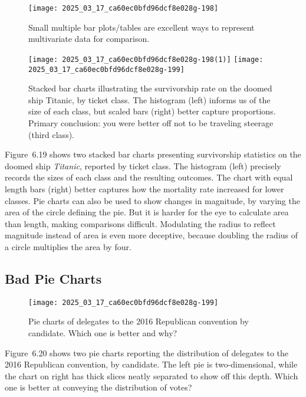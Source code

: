 \documentclass[10pt]{article}
\begin{document}
\begin{figure}[h]
\centering
\texttt{[image: 2025\_03\_17\_ca60ec0bfd96dcf8e028g-198]}
\caption{Small multiple bar plots/tables are excellent ways to represent multivariate data for comparison.}
\label{fig:small-multiples}
\end{figure}

\begin{figure}[h]
\centering
\texttt{[image: 2025\_03\_17\_ca60ec0bfd96dcf8e028g-198(1)]}
\texttt{[image: 2025\_03\_17\_ca60ec0bfd96dcf8e028g-199]}
\caption{Stacked bar charts illustrating the survivorship rate on the doomed ship Titanic, by ticket class. The histogram (left) informs us of the size of each class, but scaled bars (right) better capture proportions. Primary conclusion: you were better off not to be traveling steerage (third class).}
\end{figure}

Figure~6.19 shows two stacked bar charts presenting survivorship statistics on the doomed ship \textit{Titanic}, reported by ticket class. The histogram (left) precisely records the sizes of each class and the resulting outcomes. The chart with equal length bars (right) better captures how the mortality rate increased for lower classes. Pie charts can also be used to show changes in magnitude, by varying the area of the circle defining the pie. But it is harder for the eye to calculate area than length, making comparisons difficult. Modulating the radius to reflect magnitude instead of area is even more deceptive, because doubling the radius of a circle multiplies the area by four.

\subsection*{Bad Pie Charts}

\begin{figure}[h]
\centering
\texttt{[image: 2025\_03\_17\_ca60ec0bfd96dcf8e028g-199]}
\caption{Pie charts of delegates to the 2016 Republican convention by candidate. Which one is better and why?}
\end{figure}

Figure~6.20 shows two pie charts reporting the distribution of delegates to the 2016 Republican convention, by candidate. The left pie is two-dimensional, while the chart on right has thick slices neatly separated to show off this depth. Which one is better at conveying the distribution of votes?
\end{document}
